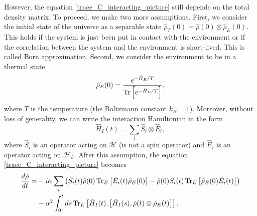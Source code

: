 However, the equation \eqref{trace_C_interacting_picture} still depends on the total density matrix. To proceed, we make two more assumptions. First, we consider the initial state of the universe as a separable state $\hat\rho_T(0)=\hat\rho(0)\otimes \hat\rho_E(0)$. This holds if the system is just been put in contact with the environment or if the correlation between the system and the environment is short-lived. This is called Born approximation. 
Second, we consider the environment to be in a thermal state 
\begin{equation}
    \hat\rho_E(0) = \frac{e^{-\hat H_E/T}}{\operatorname{Tr}\left[e^{-\hat H_E/T}\right]},
\end{equation}
where $T$ is the temperature (the Boltzmann constant $k_B = 1$).
Moreover, without loss of generality, we can write the interaction Hamiltonian in the form
\begin{equation}
    \hat H_I(t) = \sum_i \hat S_i\otimes \hat E_i,
\end{equation}
where $\hat S_i$ is an operator acting on $\mathcal{H}$ (is not a spin operator) and $\hat E_i$ is an operator acting on $\mathcal{H_E}$. After this assumption, the equation \eqref{trace_C_interacting_picture} becomes
\begin{equation}
    \begin{split}
        \frac{d\tilde\rho}{dt} =&-i\alpha\sum_i\left(\tilde S_i(t)\tilde \rho(0)\operatorname{Tr}_E\left[\tilde E_i(t)\tilde\rho_E(0)\right] - \tilde \rho(0)\tilde S_i(t)\operatorname{Tr}_E\left[\tilde\rho_E(0)\tilde E_i(t)\right]\right) \\ 
        &-\alpha^2 \int_{0}^{t}ds \operatorname{Tr}_E\left[\tilde H_I(t),\left[\tilde H_I(s),\tilde\rho(t)\otimes\tilde\rho_E(t)\right]\right].
    \end{split}
\end{equation}

